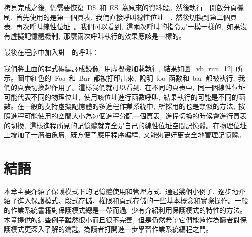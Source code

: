 拷貝完成之後,~仍需要恢復~DS~和~ES~為原來的資料段。然後執行~~開啟分頁機制,~首先使用的是第一個頁表,~我們直接呼叫線性位址~~,~然後切換到第二個頁表,~再次呼叫線性位址~。我們可以看到,~這兩次呼叫的指令是一模一樣的,~如果沒有虛擬記憶體機制,~那麼兩次呼叫執行的效果應該是一樣的。

最後在程序中加入對~~的呼叫：



我們將上面的程式碼編譯成鏡像,~用虛擬機加載執行,~結果如圖~\ref{vb_run_12}~所示。圖中紅色的~Foo~和~Bar~都被打印出來,~說明~foo~函數和~bar~都被執行,~我們的頁表切換起作用了。這樣我們就可以看到,~在不同的頁表中,~同一個線性位址可能代表不同的物理位址,~使用該位址進行函數呼叫,~結果執行的可能是不同的函數。在一般的支持虛擬記憶體的多進程作業系統中,~所採用的也是類似的方法,~按照進程可能使用的空間大小為每個進程分配一個頁表,~進程切換的時候會進行頁表的切換,~這樣進程所見的記憶體就完全是自己的線性位址空間記憶體。在物理位址上增加了一層抽象層,~既方便了應用程序編程,~又能夠更好更安全地管理記憶體。

\section{結語}

本章主要介紹了保護模式下的記憶體使用和管理方式,~通過幾個小例子,~逐步地介紹了進入保護模式、段式存儲、權限和頁式存儲的一些基本概念和實際操作。一般的作業系統書籍對保護模式總是一帶而過,~少有介紹利用保護模式的特性的方法。本章提供的這些例子雖然很小而且很不完善,~但是仍然希望它們能夠作為讀者對保護模式更深入了解的鑰匙,~為讀者打開進一步學習作業系統編程之門。
